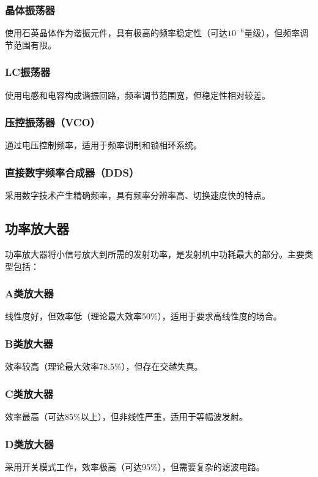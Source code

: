 \documentclass[12pt,UTF8]{ctexbook}
\begin{document}
\subsubsection{晶体振荡器}
使用石英晶体作为谐振元件，具有极高的频率稳定性（可达$10^{-6}$量级），但频率调节范围有限。

\subsubsection{LC振荡器}
使用电感和电容构成谐振回路，频率调节范围宽，但稳定性相对较差。

\subsubsection{压控振荡器（VCO）}
通过电压控制频率，适用于频率调制和锁相环系统。

\subsubsection{直接数字频率合成器（DDS）}
采用数字技术产生精确频率，具有频率分辨率高、切换速度快的特点。

\subsection{功率放大器}

功率放大器将小信号放大到所需的发射功率，是发射机中功耗最大的部分。主要类型包括：

\subsubsection{A类放大器}
线性度好，但效率低（理论最大效率50\%），适用于要求高线性度的场合。

\subsubsection{B类放大器}
效率较高（理论最大效率78.5\%），但存在交越失真。

\subsubsection{C类放大器}
效率最高（可达85\%以上），但非线性严重，适用于等幅波发射。

\subsubsection{D类放大器}
采用开关模式工作，效率极高（可达95\%），但需要复杂的滤波电路。
\end{document}

